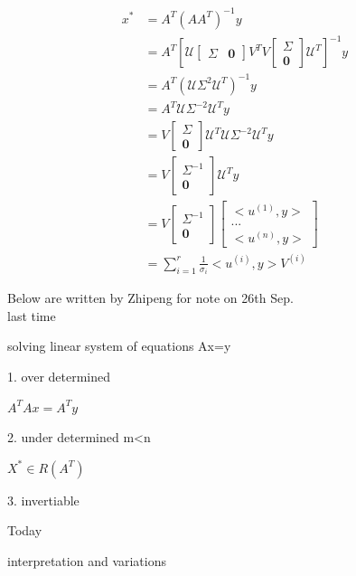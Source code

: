 \begin{align*}
x^* &= A^T(AA^T)^{-1}y\\
&= A^T\left[\mathcal{U}
\begin{bmatrix}
\Sigma & \mathbf{0}
\end{bmatrix}
V^TV
\begin{bmatrix}
\Sigma\\
\mathbf{0}
\end{bmatrix}
\mathcal{U}^T\right]^{-1}y\\
&= A^T(\mathcal{U}\Sigma^2\mathcal{U}^T)^{-1}y\\
&= A^T\mathcal{U}\Sigma^{-2}\mathcal{U}^Ty\\
&= V
\begin{bmatrix}
\Sigma\\
\mathbf{0}
\end{bmatrix}
\mathcal{U}^T\mathcal{U}\Sigma^{-2}\mathcal{U}^Ty\\
&=V
\begin{bmatrix}
\Sigma^{-1} \\
\mathbf{0}
\end{bmatrix}
\mathcal{U}^Ty\\
&= V
\begin{bmatrix}
\Sigma^{-1}\\
\mathbf{0}
\end{bmatrix}
\begin{bmatrix}
<u^{(1)}, y>\\
...\\
<u^{(n)}, y>
\end{bmatrix}\\
&= \sum^r_{i=1}\frac{1}{\sigma_i}<u^{(i)}, y>V^{(i)}
\end{align*}





Below are written by Zhipeng for note on 26th Sep. \\


last time

solving linear system of equations Ax=y

1. over determined

$A^TAx=A^Ty$


2. under determined m<n

$X^* \in R(A^T)  $ 

3. invertiable





Today

interpretation and variations 


